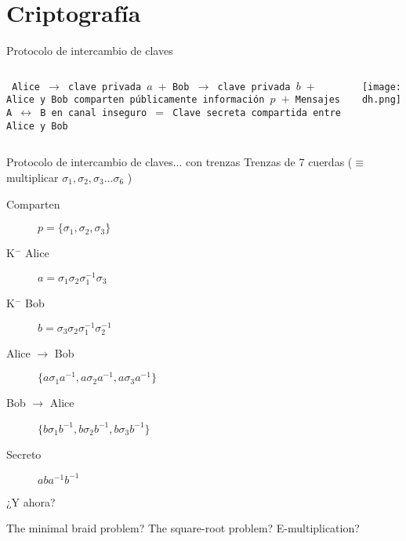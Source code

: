 \documentclass[10pt]{beamer}
\newcommand\tab[1][0.6cm]{\hspace*{#1}}
\begin{document}
\section{Criptografía}

\begin{frame}[fragile]{Protocolo de intercambio de claves}

\begin{columns}[T,onlytextwidth]
	
	\begin{center}
		\texttt{
			Alice $\rightarrow$ clave privada \textbf{$a$} \newline
			\tab $+$\newline
			Bob $\rightarrow$ clave privada \textbf{$b$} \newline
			\tab $+$\newline
			Alice y Bob comparten públicamente información  \textbf{$p$} \newline
			\tab$+$ \newline
			Mensajes A $\leftrightarrow$ B en canal inseguro \newline
			\tab$=$ \newline
			Clave secreta compartida entre Alice y Bob \newline}
	\end{center}
	
	\texttt{[image: dh.png]}
	
	
	
\end{columns}



  
\end{frame}

\begin{frame}{Protocolo de intercambio de claves... con trenzas}
	Trenzas de 7 cuerdas ($\equiv$ multiplicar $\sigma_1, \sigma_2, \sigma_3 \ldots \sigma_6$ )
	\begin{description}
		\item[Comparten]  $p = \{\sigma_1, \sigma_2, \sigma_3\}$ 
		\item[K$^-$ Alice] $a = \sigma_1\sigma_2\sigma_1^{-1}\sigma_3$
		\item[K$^-$ Bob] $b = \sigma_3\sigma_2\sigma_1^{-1}\sigma_2^{-1}$		
		\item[Alice $\rightarrow$ Bob] $\{a\sigma_1a^{-1}, a\sigma_2a^{-1}, a\sigma_3a^{-1}\}$
		\item[Bob $\rightarrow$ Alice] $\{b\sigma_1b^{-1}, b\sigma_2b^{-1}, b\sigma_3b^{-1}\}$
		\item[Secreto ] $aba^{-1}b^{-1}$
	\end{description}
\end{frame}

\begin{frame}{¿Y ahora?}

	 The minimal braid problem? \newline
	 The square-root problem? \newline
	 E-multiplication?
	
	
\end{frame}
\end{document}
